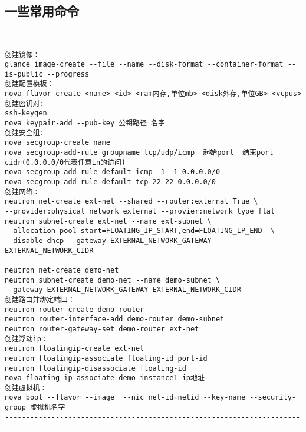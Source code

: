 \documentclass[a4paper,left=1.5cm,right=1.5cm,11pt]{article}
\begin{document}
\subsection{一些常用命令}
\begin{lstlisting}
-------------------------------------------------------------------------------------------
创建镜像：
glance image-create --file --name --disk-format --container-format --is-public --progress
创建配置模板：
nova flavor-create <name> <id> <ram内存,单位mb> <disk外存,单位GB> <vcpus>
创建密钥对:
ssh-keygen
nova keypair-add --pub-key 公钥路径 名字
创建安全组:
nova secgroup-create name
nova secgroup-add-rule groupname tcp/udp/icmp  起始port  结束port  cidr(0.0.0.0/0代表任意in的访问) 
nova secgroup-add-rule default icmp -1 -1 0.0.0.0/0
nova secgroup-add-rule default tcp 22 22 0.0.0.0/0
创建网络：
neutron net-create ext-net --shared --router:external True \
--provider:physical_network external --provier:network_type flat
neutron subnet-create ext-net --name ext-subnet \
--allocation-pool start=FLOATING_IP_START,end=FLOATING_IP_END  \
--disable-dhcp --gateway EXTERNAL_NETWORK_GATEWAY EXTERNAL_NETWORK_CIDR

neutron net-create demo-net
neutron subnet-create demo-net --name demo-subnet \
--gateway EXTERNAL_NETWORK_GATEWAY EXTERNAL_NETWORK_CIDR
创建路由并绑定端口：
neutron router-create demo-router
neutron router-interface-add demo-router demo-subnet
neutron router-gateway-set demo-router ext-net
创建浮动ip：
neutron floatingip-create ext-net
neutron floatingip-associate floating-id port-id
neutron floatingip-disassociate floating-id
nova floating-ip-associate demo-instance1 ip地址
创建虚拟机：
nova boot --flavor --image  --nic net-id=netid --key-name --security-group 虚拟机名字
-------------------------------------------------------------------------------------------
\end{lstlisting}
\end{document}

